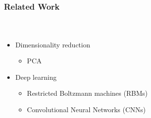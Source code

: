 
\begin{frame}[t]
	\frametitle{Related Work}
	\framesubtitle{~~}  %
	\begin{itemize}
		\item Dimensionality reduction
			\begin{itemize}
				\item PCA
			\end{itemize}
		\item Deep learning
			\begin{itemize}
				\item Restricted Boltzmann machines (RBMs)
				\item Convolutional Neural Networks (CNNs)
			\end{itemize}
	\end{itemize}


\end{frame}

